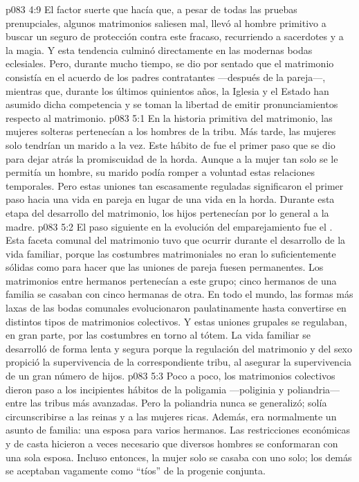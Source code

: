 \vs p083 4:9 El factor suerte que hacía que, a pesar de todas las pruebas prenupciales, algunos matrimonios saliesen mal, llevó al hombre primitivo a buscar un seguro de protección contra este fracaso, recurriendo a sacerdotes y a la magia. Y esta tendencia culminó directamente en las modernas bodas eclesiales. Pero, durante mucho tiempo, se dio por sentado que el matrimonio consistía en el acuerdo de los padres contratantes ---después de la pareja---, mientras que, durante los últimos quinientos años, la Iglesia y el Estado han asumido dicha competencia y se toman la libertad de emitir pronunciamientos respecto al matrimonio.
\vs p083 5:1 En la historia primitiva del matrimonio, las mujeres solteras pertenecían a los hombres de la tribu. Más tarde, las mujeres solo tendrían un marido a la vez. Este hábito de  fue el primer paso que se dio para dejar atrás la promiscuidad de la horda. Aunque a la mujer tan solo se le permitía un hombre, su marido podía romper a voluntad estas relaciones temporales. Pero estas uniones tan escasamente reguladas significaron el primer paso hacia una vida en pareja en lugar de una vida en la horda. Durante esta etapa del desarrollo del matrimonio, los hijos pertenecían por lo general a la madre.
\vs p083 5:2 El paso siguiente en la evolución del emparejamiento fue el . Esta faceta comunal del matrimonio tuvo que ocurrir durante el desarrollo de la vida familiar, porque las costumbres matrimoniales no eran lo suficientemente sólidas como para hacer que las uniones de pareja fuesen permanentes. Los matrimonios entre hermanos pertenecían a este grupo; cinco hermanos de una familia se casaban con cinco hermanas de otra. En todo el mundo, las formas más laxas de las bodas comunales evolucionaron paulatinamente hasta convertirse en distintos tipos de matrimonios colectivos. Y estas uniones grupales se regulaban, en gran parte, por las costumbres en torno al tótem. La vida familiar se desarrolló de forma lenta y segura porque la regulación del matrimonio y del sexo propició la supervivencia de la correspondiente tribu, al asegurar la supervivencia de un gran número de hijos.
\vs p083 5:3 Poco a poco, los matrimonios colectivos dieron paso a los incipientes hábitos de la poligamia ---poliginia y poliandria--- entre las tribus más avanzadas. Pero la poliandria nunca se generalizó; solía circunscribirse a las reinas y a las mujeres ricas. Además, era normalmente un asunto de familia: una esposa para varios hermanos. Las restricciones económicas y de casta hicieron a veces necesario que diversos hombres se conformaran con una sola esposa. Incluso entonces, la mujer solo se casaba con uno solo; los demás se aceptaban vagamente como “tíos” de la progenie conjunta.
